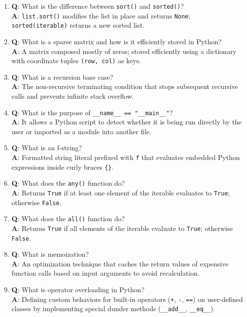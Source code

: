 \begin{enumerate}[leftmargin=1.5em]
    \item \textbf{Q}: What is the difference between \texttt{sort()} and \texttt{sorted()}?\\
    \textbf{A}: \texttt{list.sort()} modifies the list in place and returns \texttt{None}; \texttt{sorted(iterable)} returns a new sorted list.

    \item \textbf{Q}: What is a sparse matrix and how is it efficiently stored in Python?\\
    \textbf{A}: A matrix composed mostly of zeros; stored efficiently using a dictionary with coordinate tuples \texttt{(row, col)} as keys.

    \item \textbf{Q}: What is a recursion base case?\\
    \textbf{A}: The non-recursive terminating condition that stops subsequent recursive calls and prevents infinite stack overflow.

    \item \textbf{Q}: What is the purpose of \texttt{\_\_name\_\_ == "\_\_main\_\_"}?\\
    \textbf{A}: It allows a Python script to detect whether it is being run directly by the user or imported as a module into another file.

    \item \textbf{Q}: What is an f-string?\\
    \textbf{A}: Formatted string literal prefixed with \texttt{f} that evaluates embedded Python expressions inside curly braces \texttt{\{\}}.

    \item \textbf{Q}: What does the \texttt{any()} function do?\\
    \textbf{A}: Returns \texttt{True} if at least one element of the iterable evaluates to \texttt{True}; otherwise \texttt{False}.

    \item \textbf{Q}: What does the \texttt{all()} function do?\\
    \textbf{A}: Returns \texttt{True} if all elements of the iterable evaluate to \texttt{True}; otherwise \texttt{False}.

    \item \textbf{Q}: What is memoization?\\
    \textbf{A}: An optimization technique that caches the return values of expensive function calls based on input arguments to avoid recalculation.

    \item \textbf{Q}: What is operator overloading in Python?\\
    \textbf{A}: Defining custom behaviors for built-in operators (\texttt{+}, \texttt{-}, \texttt{==}) on user-defined classes by implementing special dunder methods (\texttt{\_\_add\_\_}, \texttt{\_\_eq\_\_}).
\end{enumerate}
